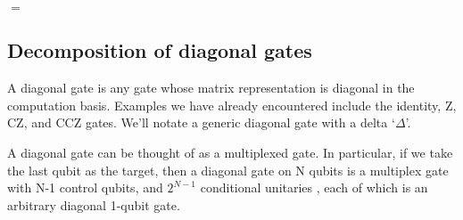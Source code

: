 \begin{center}
$ = $
\end{center}


\subsection{Decomposition of diagonal gates}

A diagonal gate is any gate whose matrix representation is diagonal in the computation basis. Examples we have already encountered include the identity, Z, CZ, and CCZ gates. We'll notate a generic diagonal gate with a delta `$\Delta$'.
\begin{center}
\end{center}
A diagonal gate can be thought of as a multiplexed gate. In particular, if we take the last qubit as the target, then a diagonal gate on N qubits is a multiplex gate with N-1 control qubits, and $2^{N-1}$ conditional unitaries , each of which is an arbitrary diagonal 1-qubit gate.

